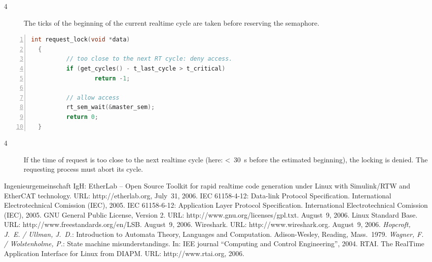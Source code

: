 \documentclass[a4paper,12pt,BCOR6mm,bibtotoc,idxtotoc]{scrbook}
\renewcommand\nomname{Glossary}
\begin{document}
\begin{description}
\item[\normalfont\textcircled{\tiny 4}] The ticks of the beginning of
  the current realtime cycle are taken before reserving the semaphore.
\end{description}

\begin{lstlisting}[language=C,numbers=left,caption={Request callback
    for reduced jitter},label={lst:redreq}]
  int request_lock(void *data)
  {
          // too close to the next RT cycle: deny access.
          if (get_cycles() - t_last_cycle > t_critical)
                  return -1;

          // allow access
          rt_sem_wait(&master_sem);
          return 0;
  }
\end{lstlisting}

\begin{description}
\item[\normalfont\textcircled{\tiny 4}] If the time of request is too
  close to the next realtime cycle (here: \textless~$30$~\textmu s
  before the estimated beginning), the locking is denied. The
  requesting process must abort its cycle.
\end{description}


\begin{thebibliography}{99}
 Ingenieurgemeinschaft IgH: EtherLab -- Open Source
  Toolkit for rapid realtime code generation under Linux with
  Simulink/RTW and EtherCAT technology. URL: http://etherlab.org,
  July~31, 2006.
 IEC 61158-4-12: Data-link Protocol Specification.
  International Electrotechnical Comission (IEC), 2005.
 IEC 61158-6-12: Application Layer Protocol
  Specification. International Electrotechnical Comission (IEC), 2005.
 GNU General Public License, Version 2. URL:
  http://www.gnu.org/licenses/gpl.txt. August~9, 2006.
 Linux Standard Base. URL:
  http://www.freestandards.org/en/LSB. August~9, 2006.
 Wireshark. URL: http://www.wireshark.org.
  August~9, 2006.
 {\it Hopcroft, J.~E. / Ullman, J.~D.}: Introduction
  to Automata Theory, Languages and Computation. Adison-Wesley,
  Reading, Mass.~1979.
 {\it Wagner, F. / Wolstenholme, P.}: State machine
  misunderstandings. In: IEE journal ``Computing and Control
  Engineering'', 2004.
 RTAI. The RealTime Application Interface for Linux from
  DIAPM. URL: http://www.rtai.org, 2006.
\end{thebibliography}

\printnomenclature
\addcontentsline{toc}{chapter}{\nomname}
\markleft{\nomname}

\printindex
{}

\end{document}
